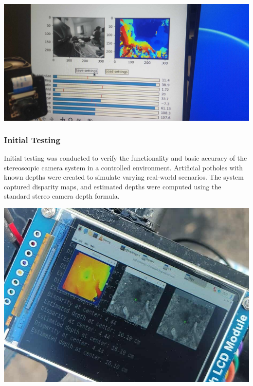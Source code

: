 \begin{center}
	\includegraphics[scale=0.15]{calibration2.jpg}
\end{center}

\subsubsection{Initial Testing}
Initial testing was conducted to verify the functionality and basic accuracy of the stereoscopic camera system in a controlled environment. Artificial potholes with known depths were created to simulate varying real-world scenarios. The system captured disparity maps, and estimated depths were computed using the standard stereo camera depth formula.

\begin{center}
	\includegraphics[scale=0.35]{initialtest.jpg}
\end{center}

